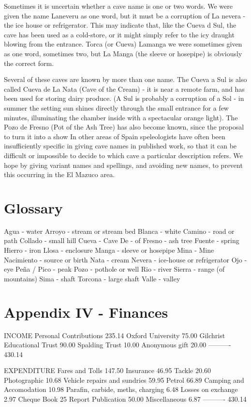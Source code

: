 \documentclass[11pt, a4paper, twoside]{memoir}
\begin{document}
Sometimes it is uncertain whether a cave name is one or two words. We were given the name Laneveru as one word, but it must be a corruption of La nevera - the ice house or refrigerator. This may indicate that, like the Cueva d Sul, the cave has been used as a cold-store, or it might simply refer to the icy draught blowing from the entrance. Torca (or Cueva) Lamanga we were sometimes given as one word, sometimes two, but La Manga (the sleeve or hosepipe) is obviously the correct form.

Several of these caves are known by more than one name. The Cueva a Sul is also called Cueva de La Nata (Cave of the Cream) - it is near a remote farm, and has been used for storing dairy produce. (A Sul is probably a corruption of a Sol - in summer the setting sun shines directly through the small entrance for a few minutes, illuminating the chamber inside with a spectacular orange light). The Pozo de Fresno (Pot of the Ash Tree) has also become known, since the proposal to turn it into a show In other areas of Spain speleologists have often been insufficiently specific in giving cave names in published work, so that it can be difficult or impossible to decide to which cave a particular description refers. We hope by giving variant names and spellings, and avoiding new names, to prevent this occurring in the El Mazuco area.


\chapter*{Glossary}


Agua - water
Arroyo - stream or stream bed
Blanca - white
Camino - road or path
Collado - small hill
Cueva - Cave
De - of
Fresno - ash tree
Fuente - spring
Hierro - iron
Llosa - enclosure
Manga - sleeve or hosepipe
Mina - Mine
Nacimiento - source or birth
Nata - cream
Nevera - ice-house or refrigerator
Ojo - eye Peña / Pico - peak
Pozo - pothole or well
Rio - river
Sierra - range (of mountains)
Sima - shaft
Torcona - large shaft
Valle - valley


\chapter*{Appendix IV - Finances}

INCOME
Personal Contributions 235.14
Oxford University 75.00
Gilchrist Educational Trust 90.00
Spalding Trust 10.00
Anonymous gift 20.00
----------
430.14

EXPENDITURE
Fares and Tolls 147.50
Insurance 46.95
Tackle 20.60
Photographic 10.68
Vehicle repairs and sundries 59.95
Petrol 66.89
Camping and Accomodation 10.98
Parafin, carbide, meths, charging 6.48
Losses on exchange 2.97
Cheque Book 25
Report Publication 50.00
Miscellaneous 6.87
----------
430.14
\end{document}
